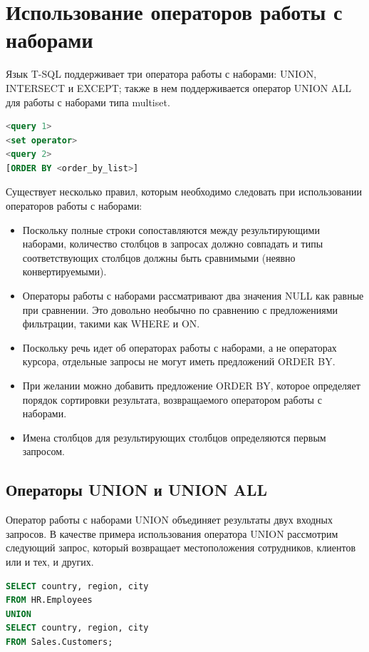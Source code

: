 \section{Использование операторов работы с наборами}

Язык T-SQL поддерживает три оператора работы с наборами: UNION, INTERSECT и EXCEPT; также в нем поддерживается оператор UNION ALL
для работы с наборами типа multiset.


\begin{lstlisting}[label=lst:funcReturn, language=sql]
<query 1>
<set operator>
<query 2>
[ORDER BY <order_by_list>] 
\end{lstlisting}

Существует несколько правил, которым необходимо следовать при использовании
операторов работы с наборами:

\begin{itemize}
	\item Поскольку полные строки сопоставляются между результирующими наборами,
	количество столбцов в запросах должно совпадать и типы соответствующих
	столбцов должны быть сравнимыми (неявно конвертируемыми). 
	\item Операторы работы с наборами рассматривают два значения NULL как равные при
	сравнении. Это довольно необычно по сравнению с предложениями фильтрации, такими как WHERE и ON.
	\item Поскольку речь идет об операторах работы с наборами, а не операторах курсора,
	отдельные запросы не могут иметь предложений ORDER BY. 
	\item При желании можно добавить предложение ORDER BY, которое определяет порядок сортировки результата, возвращаемого оператором работы с наборами. 
	\item Имена столбцов для результирующих столбцов определяются первым запросом. 
\end{itemize}
	
\subsection{Операторы UNION и UNION ALL}

Оператор работы с наборами UNION объединяет результаты двух входных запросов.
В качестве примера использования оператора UNION рассмотрим следующий запрос,
который возвращает местоположения сотрудников, клиентов или и тех, и других. 

\begin{lstlisting}[label=lst:funcReturn, language=sql]
SELECT country, region, city
FROM HR.Employees
UNION
SELECT country, region, city
FROM Sales.Customers; 
\end{lstlisting}


